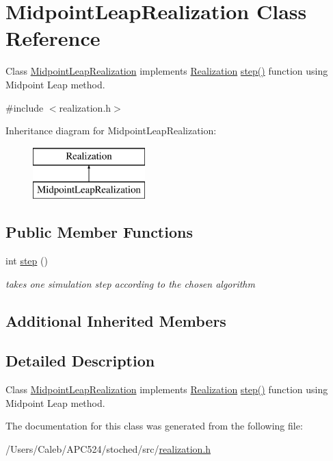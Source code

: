 \hypertarget{class_midpoint_leap_realization}{}\section{Midpoint\+Leap\+Realization Class Reference}
\label{class_midpoint_leap_realization}


Class \hyperlink{class_midpoint_leap_realization}{Midpoint\+Leap\+Realization} implements \hyperlink{class_realization}{Realization} \hyperlink{class_midpoint_leap_realization_a6c3e52150f488b7daccc2d0caa0cb378}{step()} function using Midpoint Leap method.  




{\ttfamily \#include $<$realization.\+h$>$}

Inheritance diagram for Midpoint\+Leap\+Realization\+:\begin{figure}[H]
\begin{center}
\leavevmode
\includegraphics[height=2.000000cm]{class_midpoint_leap_realization}
\end{center}
\end{figure}
\subsection*{Public Member Functions}
\begin{DoxyCompactItemize}
\item 
\mbox{\label{class_midpoint_leap_realization_a6c3e52150f488b7daccc2d0caa0cb378}} 
int \hyperlink{class_midpoint_leap_realization_a6c3e52150f488b7daccc2d0caa0cb378}{step} ()
\begin{DoxyCompactList}\small\item\em takes one simulation step according to the chosen algorithm \end{DoxyCompactList}\end{DoxyCompactItemize}
\subsection*{Additional Inherited Members}


\subsection{Detailed Description}
Class \hyperlink{class_midpoint_leap_realization}{Midpoint\+Leap\+Realization} implements \hyperlink{class_realization}{Realization} \hyperlink{class_midpoint_leap_realization_a6c3e52150f488b7daccc2d0caa0cb378}{step()} function using Midpoint Leap method. 

The documentation for this class was generated from the following file\+:\begin{DoxyCompactItemize}
\item 
/\+Users/\+Caleb/\+A\+P\+C524/stoched/src/\hyperlink{realization_8h}{realization.\+h}\end{DoxyCompactItemize}
